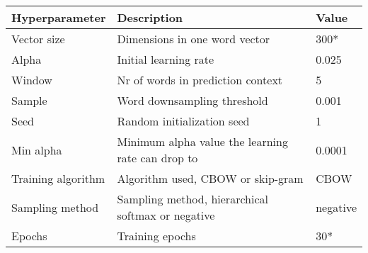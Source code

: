 \begin{tabular}{|l|l|l|} \hline
\textbf{Hyperparameter} & \textbf{Description} & \textbf{Value} \\ \hline
Vector size & Dimensions in one word vector & 300* \\ \hline
Alpha & Initial learning rate & 0.025 \\ \hline
Window & Nr of words in prediction context & 5 \\ \hline
Sample & Word downsampling threshold & 0.001 \\ \hline
Seed & Random initialization seed & 1 \\ \hline
Min alpha & Minimum alpha value the learning rate can drop to & 0.0001 \\ \hline
Training algorithm & Algorithm used, CBOW or skip-gram & CBOW \\ \hline
Sampling method & Sampling method, hierarchical softmax or negative & negative \\ \hline
Epochs & Training epochs & 30* \\ \hline
\end{tabular}